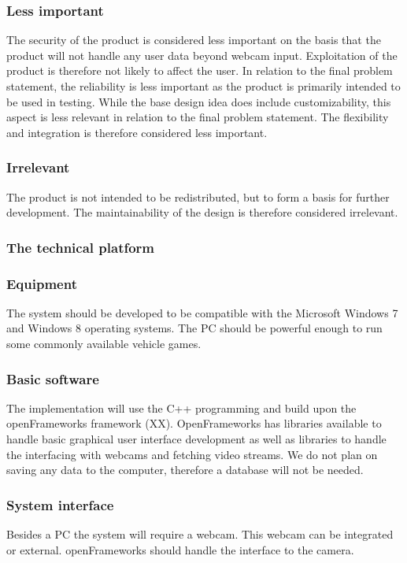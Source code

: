 \subsubsection*{Less important}
The security of the product is considered less important on the basis that the product will not handle any user data beyond webcam input. Exploitation of the product is therefore not likely to affect the user. In relation to the final problem statement, the reliability is less important as the product is primarily intended to be used in testing. While the base design idea does include customizability, this aspect is less relevant in relation to the final problem statement. The flexibility and integration is therefore considered less important. 

\subsubsection*{Irrelevant}
The product is not intended to be redistributed, but to form a basis for further development. The maintainability of the design is therefore considered irrelevant.

\subsubsection{The technical platform}
\subsubsection*{Equipment}
The system should be developed to be compatible with the Microsoft Windows 7 and Windows 8 operating systems. The PC should be powerful enough to run some commonly available vehicle games. 

\subsubsection*{Basic software}
The implementation will use the C++ programming and build upon the openFrameworks framework (XX). OpenFrameworks has libraries available to handle basic graphical user interface development as well as libraries to handle the interfacing with webcams and fetching video streams. We do not plan on saving any data to the computer, therefore a database will not be needed.

\subsubsection*{System interface}
Besides a PC the system will require a webcam. This webcam can be integrated or external. openFrameworks should handle the interface to the camera.

